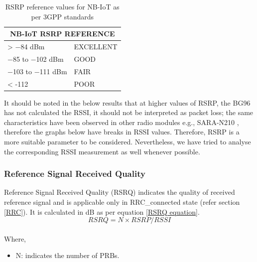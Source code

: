 \documentclass[12pt]{article}
\begin{document}
\begin{table}[h]
\caption {RSRP reference values for NB-IoT as per 3GPP standards \cite{3GPP,sikora2019performance}}
\centering

\begin{tabular}{|p{5cm}|p{5cm}|}
\hline
\multicolumn{2}{|c|}{NB-IoT RSRP REFERENCE} \\ \hline
> −84 dBm                            & EXCELLENT                    \\ \hline
−85 to −102 dBm                      & GOOD                         \\ \hline
−103 to −111 dBm                     & FAIR                         \\ \hline
< -112                               & POOR                         \\ \hline
\end{tabular}
\label{nbiotRSRP}
\end{table}




It should be noted in the below results that at higher values of RSRP, the BG96 has not calculated the RSSI, it should not be interpreted as packet loss; the same characteristics have been observed in other radio modules e.g., SARA-N210 \cite{basu2019experimental}, therefore the graphs below have breaks in RSSI values. Therefore, RSRP is a more suitable parameter to be considered. Nevertheless, we have tried to analyse the corresponding RSSI measurement as well whenever possible.

\subsubsection{Reference Signal Received Quality}
Reference Signal Received Quality (RSRQ) indicates the quality of received reference signal and is applicable only in RRC\_connected state (refer section \ref{RRC}). It is calculated in dB as per equation \ref{RSRQ equation}. 
\begin{equation}
     RSRQ= {{N\times} RSRP/ RSSI}
     \label{RSRQ equation}
\end{equation}
\\ Where,
\begin{itemize}
    \item N: indicates the number of PRBs.
\end{itemize}
\end{document}
